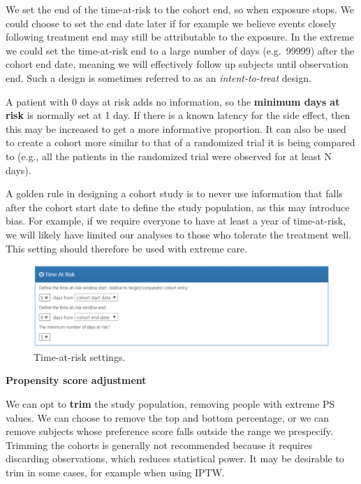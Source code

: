 \documentclass[]{book}
\let\BeginKnitrBlock\begin \let\EndKnitrBlock\end
\begin{document}
We set the end of the time-at-risk to the cohort end, so when exposure
stops. We could choose to set the end date later if for example we
believe events closely following treatment end may still be attributable
to the exposure. In the extreme we could set the time-at-risk end to a
large number of days (e.g.~99999) after the cohort end date, meaning we
will effectively follow up subjects until observation end. Such a design
is sometimes referred to as an \emph{intent-to-treat} design.

A patient with 0 days at risk adds no information, so the
\textbf{minimum days at risk} is normally set at 1 day. If there is a
known latency for the side effect, then this may be increased to get a
more informative proportion. It can also be used to create a cohort more
similar to that of a randomized trial it is being compared to (e.g., all
the patients in the randomized trial were observed for at least N days).

\BeginKnitrBlock{rmdimportant}
A golden rule in designing a cohort study is to never use information
that falls after the cohort start date to define the study population,
as this may introduce bias. For example, if we require everyone to have
at least a year of time-at-risk, we will likely have limited our
analyses to those who tolerate the treatment well. This setting should
therefore be used with extreme care.
\EndKnitrBlock{rmdimportant}

\begin{figure}

{\centering \includegraphics[width=1\linewidth]{images/PopulationLevelEstimation/timeAtRisk} 

}

\caption{Time-at-risk settings.}\label{fig:timeAtRisk}
\end{figure}

\textbf{Propensity score adjustment}

We can opt to \textbf{trim} the study population, removing people with
extreme PS values. We can choose to remove the top and bottom
percentage, or we can remove subjects whose preference score
\citep{walker_2013} falls outside the range we prespecify. Trimming the
cohorts is generally not recommended because it requires discarding
observations, which reduces statistical power. It may be desirable to
trim in some cases, for example when using IPTW.
\end{document}

